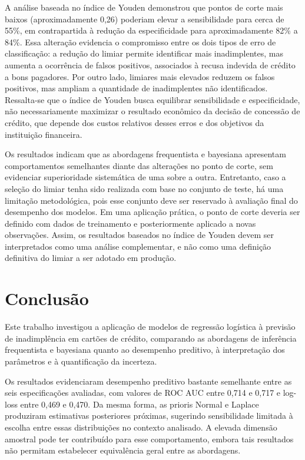 \documentclass[
  brazilian,
  12pt,
  letterpaper,
  DIV=11,
  numbers=noendperiod]{scrartcl}
\begin{document}
A análise baseada no índice de Youden demonstrou que pontos de corte
mais baixos (aproximadamente 0,26) poderiam elevar a sensibilidade para
cerca de 55\%, em contrapartida à redução da especificidade para
aproximadamente 82\% a 84\%. Essa alteração evidencia o compromisso
entre os dois tipos de erro de classificação: a redução do limiar
permite identificar mais inadimplentes, mas aumenta a ocorrência de
falsos positivos, associados à recusa indevida de crédito a bons
pagadores. Por outro lado, limiares mais elevados reduzem os falsos
positivos, mas ampliam a quantidade de inadimplentes não identificados.
Ressalta-se que o índice de Youden busca equilibrar sensibilidade e
especificidade, não necessariamente maximizar o resultado econômico da
decisão de concessão de crédito, que depende dos custos relativos desses
erros e dos objetivos da instituição financeira.

Os resultados indicam que as abordagens frequentista e bayesiana
apresentam comportamentos semelhantes diante das alterações no ponto de
corte, sem evidenciar superioridade sistemática de uma sobre a outra.
Entretanto, caso a seleção do limiar tenha sido realizada com base no
conjunto de teste, há uma limitação metodológica, pois esse conjunto
deve ser reservado à avaliação final do desempenho dos modelos. Em uma
aplicação prática, o ponto de corte deveria ser definido com dados de
treinamento e posteriormente aplicado a novas observações. Assim, os
resultados baseados no índice de Youden devem ser interpretados como uma
análise complementar, e não como uma definição definitiva do limiar a
ser adotado em produção.

\section{Conclusão}\label{conclusuxe3o}

Este trabalho investigou a aplicação de modelos de regressão logística à
previsão de inadimplência em cartões de crédito, comparando as
abordagens de inferência frequentista e bayesiana quanto ao desempenho
preditivo, à interpretação dos parâmetros e à quantificação da
incerteza.

Os resultados evidenciaram desempenho preditivo bastante semelhante
entre as seis especificações avaliadas, com valores de ROC AUC entre
0,714 e 0,717 e log-loss entre 0,469 e 0,470. Da mesma forma, as prioris
Normal e Laplace produziram estimativas posteriores próximas, sugerindo
sensibilidade limitada à escolha entre essas distribuições no contexto
analisado. A elevada dimensão amostral pode ter contribuído para esse
comportamento, embora tais resultados não permitam estabelecer
equivalência geral entre as abordagens.
\end{document}
